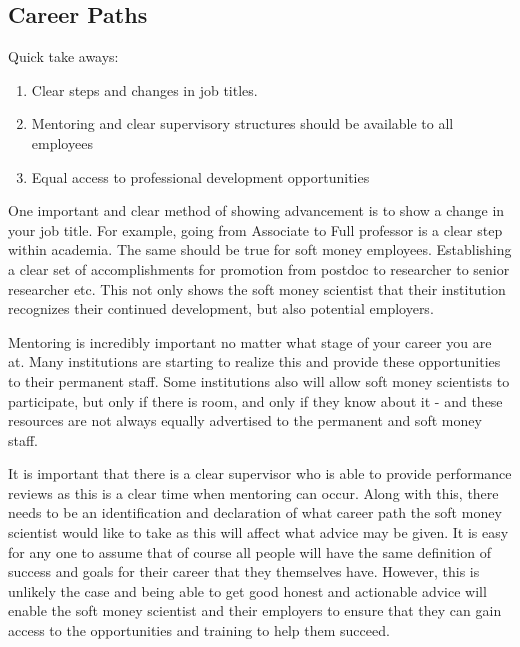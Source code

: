 \documentclass[letterpaper, 12pt]{article}
\begin{document}
\subsection{Career Paths}
\begin{tcolorbox}[enhanced,width=\textwidth,center upper,
    fontupper=\bfseries,sharp corners, colback=CASIIlightgrey, colframe=CASIIdarkgreen]
\textcolor{CASIIorange}{Quick take aways:}
\begin{enumerate}
    \item \textcolor{CASIIdarkindago}{Clear steps and changes in job titles.  }
    \item \textcolor{CASIIdarkindago}{Mentoring and clear supervisory structures should be available to all employees}
    \item \textcolor{CASIIdarkindago}{Equal access to professional development opportunities}

\end{enumerate}
\end{tcolorbox}

One important and clear method of showing advancement is to show a change in your job title. For example, going from Associate to Full professor is a clear step within academia. The same should be true for soft money employees. Establishing a clear set of accomplishments for promotion from postdoc to researcher to senior researcher etc. This not only shows the soft money scientist that their institution recognizes their continued development, but also potential employers.  

Mentoring is incredibly important no matter what stage of your career you are at. Many institutions are starting to realize this and provide these opportunities to their permanent staff. Some institutions also will allow soft money scientists to participate, but only if there is room, and only if they know about it - and these resources are not always equally advertised to the permanent and soft money staff. 

It is important that there is a clear supervisor who is able to provide performance reviews as this is a clear time when mentoring can occur. Along with this, there needs to be an identification and declaration of what career path the soft money scientist would like to take as this will affect what advice may be given. It is easy for any one to assume that of course all people will have the same definition of success and goals for their career that they themselves have. However, this is unlikely the case and being able to get good honest and actionable advice will enable the soft money scientist and their employers to ensure that they can gain access to the opportunities and training to help them succeed. 
\end{document}
